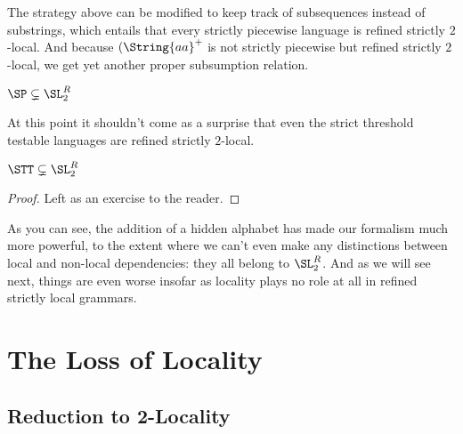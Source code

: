 The strategy above can be modified to keep track of subsequences instead of substrings, which entails that every strictly piecewise language is refined strictly $2$-local.
And because $(\String{aa}^+$ is not strictly piecewise but refined strictly $2$-local, we get yet another proper subsumption relation.
%
\begin{lemma}
    $\SP \subsetneq \SL_2^R$
\end{lemma}
%
At this point it shouldn't come as a surprise that even the strict threshold testable languages are refined strictly $2$-local.
%
\begin{lemma}
    $\STT \subsetneq \SL_2^R$
\end{lemma}
%
\begin{proof}
    Left as an exercise to the reader.
\end{proof}

As you can see, the addition of a hidden alphabet has made our formalism much more powerful, to the extent where we can't even make any distinctions between local and non-local dependencies: they all belong to $\SL_2^R$.
And as we will see next, things are even worse insofar as locality plays no role at all in refined strictly local grammars.


\section{The Loss of Locality}

\subsection{Reduction to 2-Locality}

